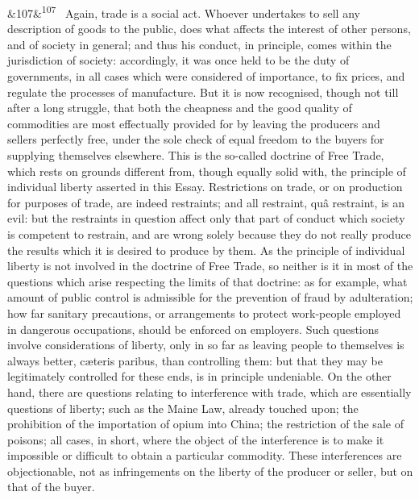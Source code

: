 \documentclass[12pt]{article}
\newcommand{\para}[1][]{\par\noindent\ifx&#1&\else\textsuperscript{\footnotesize #1}~\fi}
\begin{document}
\para[107] Again, trade is a social act. Whoever undertakes to sell any description of goods to the public, does what affects the interest of other persons, and of society in general; and thus his conduct, in principle, comes within the jurisdiction of society: accordingly, it was once held to be the duty of governments, in all cases which were considered of importance, to fix prices, and regulate the processes of manufacture. But it is now recognised, though not till after a long struggle, that both the cheapness and the good quality of commodities are most effectually provided for by leaving the producers and sellers perfectly free, under the sole check of equal freedom to the buyers for supplying themselves elsewhere. This is the so-called doctrine of Free Trade, which rests on grounds different from, though equally solid with, the principle of individual liberty asserted in this Essay. Restrictions on trade, or on production for purposes of trade, are indeed restraints; and all restraint, quâ restraint, is an evil: but the restraints in question affect only that part of conduct which society is competent to restrain, and are wrong solely because they do not really produce the results which it is desired to produce by them. As the principle of individual liberty is not involved in the doctrine of Free Trade, so neither is it in most of the questions which arise respecting the limits of that doctrine: as for example, what amount of public control is admissible for the prevention of fraud by adulteration; how far sanitary precautions, or arrangements to protect work-people employed in dangerous occupations, should be enforced on employers. Such questions involve considerations of liberty, only in so far as leaving people to themselves is always better, cæteris paribus, than controlling them: but that they may be legitimately controlled for these ends, is in principle undeniable. On the other hand, there are questions relating to interference with trade, which are essentially questions of liberty; such as the Maine Law, already touched upon; the prohibition of the importation of opium into China; the restriction of the sale of poisons; all cases, in short, where the object of the interference is to make it impossible or difficult to obtain a particular commodity. These interferences are objectionable, not as infringements on the liberty of the producer or seller, but on that of the buyer.
\end{document}
